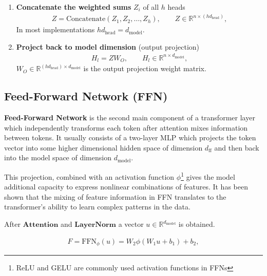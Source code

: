 {\begin{enumerate}
    This gives a context-aware representation based on all tokens in the sequence.
    \item \textbf{Concatenate the weighted sums} $Z_i$ of all $h$ heads
    \begin{align}
        Z = \mathrm{Concatenate}(Z_1, Z_2, \dots, Z_h),
        \qquad
        Z \in \mathbb{R}^{n \times (h d_{\mathrm{head}})},
    \end{align}
    In most implementations $h d_{\mathrm{head}} = d_{\mathrm{model}}$.
    \item \textbf{Project back to model dimension} (output projection)
    \begin{align}
        H_l = ZW_O,
        \qquad
        H_l \in \mathbb{R}^{n \times d_{\mathrm{model}}},
    \end{align}
    $W_O \in \mathbb{R}^{(h d_{\mathrm{head}}) \times d_{\mathrm{model}}}$ is the output projection weight matrix.

\end{enumerate}
}

\subsection{Feed-Forward Network (FFN)}

\textbf{Feed-Forward Network} is the second main component of a transformer layer which independently transforms each token after attention mixes information between tokens.
It usually consists of a two-layer MLP which projects the token vector into some higher dimensional hidden space of dimension $d_{\mathrm{ff}}$ and then back into the model space of dimension $d_{\mathrm{model}}$. \parencite{AttentionIsAllYouNeed}

This projection, combined with an activation function $\phi$\footnote{ReLU and GELU are commonly used activation functions in FFNs} gives the model additional capacity to express nonlinear combinations of features.
It has been shown that the mixing of feature information in FFN translates to the transformer's ability to learn complex patterns in the data. \parencite{Dai2022}
\bigskip

\noindent After $\textbf{Attention}$ and $\textbf{LayerNorm}$ a vector $u \in \mathbb{R}^{d_{\mathrm{model}}}$ is obtained.

\begin{align}
    F = \mathrm{FFN}_{\phi}(u) = W_2 \phi(W_1 u + b_1) + b_2,
\end{align}

\smallskip

